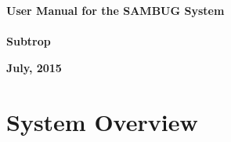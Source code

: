 \documentclass[11pt,a4paper,titlepage]{article}
\begin{document}

\begin{titlepage}
	
	
	\begin{center}
		\vspace*{-3cm}
	\end{center}
	
	
    \centering
    \vfill
    {\bfseries\Huge
    \vspace*{-3cm}
         User Manual for the SAMBUG System\\
      \hfill\\
         \Large Subtrop
        \vskip2cm
    }        
    
    \textbf{July, 2015}
    \vfill
\end{titlepage}
	
	

\tableofcontents

\pagebreak

\section{System Overview}
\end{document}
